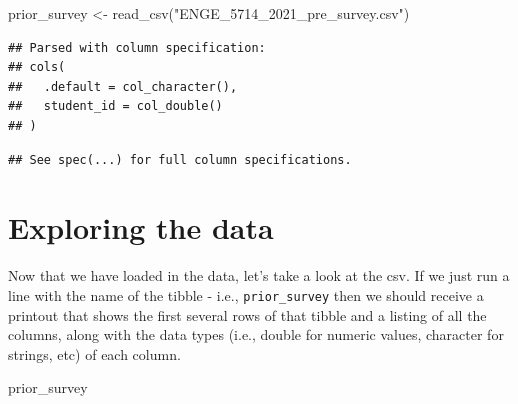 \documentclass[
]{book}
\newenvironment{Shaded}{\begin{snugshade}}{\end{snugshade}}
\newcommand{\FunctionTok}[1]{\textcolor[rgb]{0.00,0.00,0.00}{#1}}
\newcommand{\NormalTok}[1]{#1}
\newcommand{\OtherTok}[1]{\textcolor[rgb]{0.56,0.35,0.01}{#1}}
\newcommand{\StringTok}[1]{\textcolor[rgb]{0.31,0.60,0.02}{#1}}
\begin{document}
\begin{Shaded}
\begin{Highlighting}[]
\NormalTok{prior\_survey }\OtherTok{\textless{}{-}} \FunctionTok{read\_csv}\NormalTok{(}\StringTok{"ENGE\_5714\_2021\_pre\_survey.csv"}\NormalTok{)}
\end{Highlighting}
\end{Shaded}

\begin{verbatim}
## Parsed with column specification:
## cols(
##   .default = col_character(),
##   student_id = col_double()
## )
\end{verbatim}

\begin{verbatim}
## See spec(...) for full column specifications.
\end{verbatim}

\hypertarget{exploring-the-data}{%
\section{Exploring the data}\label{exploring-the-data}}

Now that we have loaded in the data, let's take a look at the csv. If we just run a line with the name of the tibble - i.e., \texttt{prior\_survey} then we should receive a printout that shows the first several rows of that tibble and a listing of all the columns, along with the data types (i.e., double for numeric values, character for strings, etc) of each column.

\begin{Shaded}
\begin{Highlighting}[]
\NormalTok{prior\_survey}
\end{Highlighting}
\end{Shaded}
\end{document}

